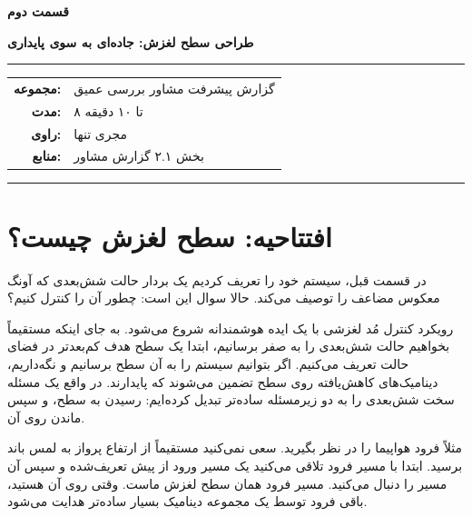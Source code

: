 \documentclass[12pt, a4paper]{article}
\newcommand{\dash}{\lr{---}}
\begin{document}

\thispagestyle{empty}

\vspace*{1.2cm}

{\centering
{\color{seriesblue}\fontsize{24}{30}\selectfont\bfseries قسمت دوم}

\vspace{0.5cm}
{\fontsize{15}{20}\selectfont\bfseries طراحی سطح لغزش: جاده‌ای به سوی پايداری}

\vspace{0.9cm}
{\color{seriesblue}\rule{0.55\linewidth}{1pt}}
\vspace{0.7cm}

{\normalsize
\begin{tabular}{rl}
  \textbf{مجموعه:}     & گزارش پيشرفت مشاور \dash{} بررسی عمیق \\[5pt]
  \textbf{مدت:}        & ۸ تا ۱۰ دقیقه \\[5pt]
  \textbf{راوی:}       & مجری تنها \\[5pt]
  \textbf{منابع:}      & بخش ۲.۱ گزارش مشاور \\
\end{tabular}
}

\vspace{0.9cm}
{\color{seriesblue}\rule{0.55\linewidth}{0.4pt}}
\par}

\vspace{1.2cm}

\section{افتتاحیه: سطح لغزش چيست؟}

در قسمت قبل، سيستم خود را تعريف کرديم \dash{} يک بردار حالت شش‌بعدی که آونگ معکوس مضاعف را توصيف می‌کند. حالا سوال اين است: چطور آن را کنترل کنيم؟

رويکرد کنترل مُد لغزشی با يک ايده هوشمندانه شروع می‌شود. به جای اينکه مستقيماً بخواهيم حالت شش‌بعدی را به صفر برسانيم، ابتدا يک سطح هدف کم‌بعدتر در فضای حالت تعريف می‌کنيم. اگر بتوانيم سيستم را به آن سطح برسانيم و نگه‌داريم، ديناميک‌های کاهش‌يافته روی سطح تضمين می‌شوند که پايدارند. در واقع يک مسئله سخت شش‌بعدی را به دو زير‌مسئله ساده‌تر تبديل کرده‌ايم: رسيدن به سطح، و سپس ماندن روی آن.

مثلاً فرود هواپيما را در نظر بگيريد. سعی نمی‌کنيد مستقيماً از ارتفاع پرواز به لمس باند برسيد. ابتدا با مسير فرود تلاقی می‌کنيد \dash{} يک مسير ورود از پيش تعريف‌شده \dash{} و سپس آن مسير را دنبال می‌کنيد. مسير فرود همان سطح لغزش ماست. وقتی روی آن هستيد، باقی فرود توسط يک مجموعه ديناميک بسيار ساده‌تر هدايت می‌شود.
\end{document}
